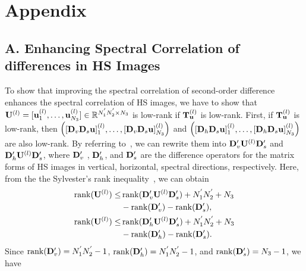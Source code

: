 \section*{Appendix}
\subsection*{A. Enhancing Spectral Correlation of differences in HS Images}
To show that improving the spectral correlation of second-order difference enhances the spectral correlation of HS images, we have to show that $\mathbf{U}^{(l)} = \lbrack\mathbf{u}_{1}^{(l)}, \ldots, \mathbf{u}_{N_{3}}^{(l)}\rbrack \in \mathbb{R}^{N_{1}^{'} N_{2}^{'} \times N_{3}}$ is low-rank if $\mathbf{T}_{\mathbf{u}}^{(l)}$ is low-rank. First, if $\mathbf{T}_{\mathbf{u}}^{(l)}$ is low-rank, then $\begin{pmatrix} \lbrack  \mathbf{D}_{v} \mathbf{D}_{s} \mathbf{u} \rbrack_{1}^{(l)}, \ldots, \lbrack  \mathbf{D}_{v} \mathbf{D}_{s} \mathbf{u} \rbrack_{N_{3}}^{(l)}\end{pmatrix}$ and $\begin{pmatrix} \lbrack  \mathbf{D}_{h} \mathbf{D}_{s} \mathbf{u} \rbrack_{1}^{(l)}, \ldots, \lbrack  \mathbf{D}_{h} \mathbf{D}_{s} \mathbf{u} \rbrack_{N_{3}}^{(l)}\end{pmatrix}$ are also low-rank. By referring to~\cite{Aggarwal2016SSTV}, we can rewrite them into 
$\mathbf{D}_{v}^{\prime} \mathbf{U}^{(l)} \mathbf{D}_{s}^{\prime}$ and $\mathbf{D}_{h}^{\prime} \mathbf{U}^{(l)} \mathbf{D}_{s}^{\prime}$, where $\mathbf{D}_{v}^{\prime}$
, $\mathbf{D}_{h}^{\prime}$, and $\mathbf{D}_{s}^{\prime}$ are the difference operators for the matrix forms of HS images in vertical, horizontal, spectral directions, respectively.
Here, from the the Sylvester’s rank inequality~\cite{Matsaglia1974Equalities}, we can obtain 
\begin{align}
	\operatorname{rank}(\mathbf{U}^{(l)}) \leq 
	& \operatorname{rank}(\mathbf{D}_{v}^{\prime} \mathbf{U}^{(l)} \mathbf{D}_{s}^{\prime}) + N_{1}^{'} N_{2}^{'} + N_{3} 
	\nonumber \\
	& - \operatorname{rank}(\mathbf{D}_{v}^{\prime}) - \operatorname{rank}(\mathbf{D}_{s}^{\prime}),
	\nonumber \\
	\operatorname{rank}(\mathbf{U}^{(l)}) \leq 
	& \operatorname{rank}(\mathbf{D}_{h}^{\prime} \mathbf{U}^{(l)} \mathbf{D}_{s}^{\prime}) + N_{1}^{'} N_{2}^{'} + N_{3} 
	\nonumber \\
	& - \operatorname{rank}(\mathbf{D}_{h}^{\prime}) - \operatorname{rank}(\mathbf{D}_{s}^{\prime}).
\end{align}
Since $\operatorname{rank}(\mathbf{D}_{v}^{\prime}) = N_{1}^{'} N_{2}^{'} - 1$, $\operatorname{rank}(\mathbf{D}_{h}^{\prime}) = N_{1}^{'} N_{2}^{'} - 1$, and $\operatorname{rank}(\mathbf{D}_{s}^{\prime}) = N_{3}-1$, we have
